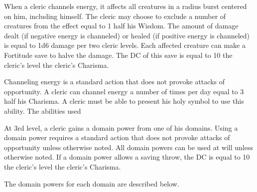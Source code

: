 When a cleric channels energy, it affects all creatures in a \areamed radius burst centered on him, including himself. The cleric may choose to exclude a number of creatures from the effect equal to 1 \add half his Wisdom. The amount of damage dealt (if negative energy is channeled) or healed (if positive energy is channeled) is equal to 1d6 damage per two cleric levels. Each affected creature can make a Fortitude save to halve the damage. The DC of this save is equal to 10 \add the cleric's level \add the cleric's Charisma.

Channeling energy is a standard action that does not provoke attacks of opportunity. A cleric can channel energy a number of times per day equal to 3 \add half his Charisma. A cleric must be able to present his holy symbol to use this ability. The abilities used 

 At 3rd level, a cleric gains a domain power from one of his domains. Using a domain power requires a standard action that does not provoke attacks of opportunity unless otherwise noted. All domain powers can be used at will unless otherwise noted. If a domain power allows a saving throw, the DC is equal to 10 \add the cleric's level \add the cleric's Charisma.
\par The domain powers for each domain are described below.

